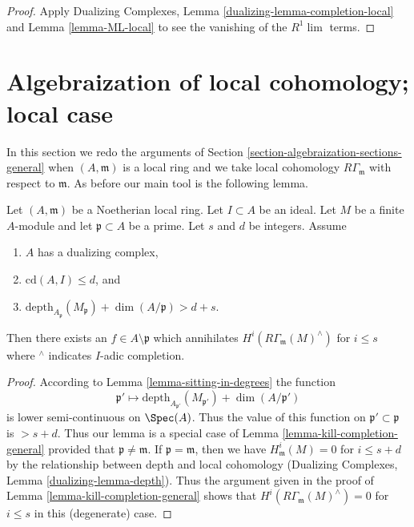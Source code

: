 \begin{proof}
Apply Dualizing Complexes, Lemma \ref{dualizing-lemma-completion-local}
and Lemma \ref{lemma-ML-local} to see the vanishing of the $R^1\lim$ terms.
\end{proof}





\section{Algebraization of local cohomology; local case}
\label{section-algebraization-punctured}

\noindent
In this section we redo the arguments of
Section \ref{section-algebraization-sections-general}
when $(A, \mathfrak m)$ is a local ring and we take local cohomology
$R\Gamma_\mathfrak m$ with respect to $\mathfrak m$. As before our
main tool is the following lemma.

\begin{lemma}
\label{lemma-kill-completion}
Let $(A, \mathfrak m)$ be a Noetherian local ring.
Let $I \subset A$ be an ideal. Let $M$ be a finite $A$-module and
let $\mathfrak p \subset A$ be a prime. Let $s$ and $d$ be integers. Assume
\begin{enumerate}
\item $A$ has a dualizing complex,
\item $\text{cd}(A, I) \leq d$, and
\item
$\text{depth}_{A_\mathfrak p}(M_\mathfrak p) + \dim(A/\mathfrak p) > d + s$.
\end{enumerate}
Then there exists an $f \in A \setminus \mathfrak p$ which annihilates
$H^i(R\Gamma_\mathfrak m(M)^\wedge)$ for $i \leq s$ where ${}^\wedge$
indicates $I$-adic completion.
\end{lemma}

\begin{proof}
According to Lemma \ref{lemma-sitting-in-degrees}
the function
$$
\mathfrak p' \longmapsto
\text{depth}_{A_{\mathfrak p'}}(M_{\mathfrak p'}) + \dim(A/\mathfrak p')
$$
is lower semi-continuous on $\Spec(A)$. Thus the value
of this function on $\mathfrak p' \subset \mathfrak p$
is $> s + d$. Thus our lemma is a special case of
Lemma \ref{lemma-kill-completion-general}
provided that $\mathfrak p \not = \mathfrak m$.
If $\mathfrak p = \mathfrak m$,
then we have $H^i_\mathfrak m(M) = 0$ for $i \leq s + d$ by
the relationship between depth and local cohomology
(Dualizing Complexes, Lemma \ref{dualizing-lemma-depth}).
Thus the argument given in the proof of
Lemma \ref{lemma-kill-completion-general}
shows that $H^i(R\Gamma_\mathfrak m(M)^\wedge) = 0$
for $i \leq s$ in this (degenerate) case.
\end{proof}

